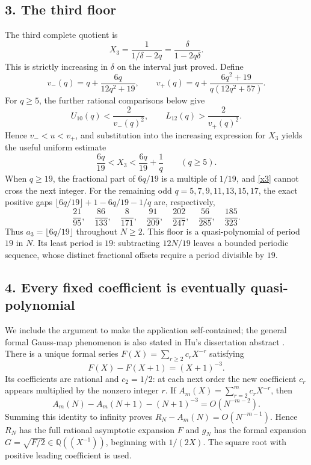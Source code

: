 \documentclass[11pt]{article}
\newcommand{\Q}{\mathbb Q}
\begin{document}
\subsection*{3. The third floor}
The third complete quotient is
\[
 X_3=\frac1{1/\delta-2q}=\frac{\delta}{1-2q\delta}.
\]
This is strictly increasing in $\delta$ on the interval just proved.
Define
\[
 v_-(q)=q+\frac{6q}{12q^2+19},\qquad
 v_+(q)=q+\frac{6q^2+19}{q(12q^2+57)}.
\]
For $q\ge5$, the further rational comparisons below give
\[
 U_{10}(q)<\frac2{v_-(q)^2},
 \qquad L_{12}(q)>\frac2{v_+(q)^2}.
\]
Hence $v_-<u<v_+$, and substitution into the increasing expression
for $X_3$ yields the useful uniform estimate
\begin{equation}\label{x3}
 \frac{6q}{19}<X_3<\frac{6q}{19}+\frac1q\qquad(q\ge5).
\end{equation}
When $q\ge19$, the fractional part of $6q/19$ is a multiple of $1/19$,
and \eqref{x3} cannot cross the next integer. For the remaining odd
$q=5,7,9,11,13,15,17$, the exact positive gaps
$\lfloor6q/19\rfloor+1-6q/19-1/q$ are, respectively,
\[
 \frac{21}{95},\quad\frac{86}{133},\quad\frac8{171},\quad
 \frac{91}{209},\quad\frac{202}{247},\quad
 \frac{56}{285},\quad\frac{185}{323}.
\]
Thus $a_3=\lfloor6q/19\rfloor$ throughout $N\ge2$.
This floor is a quasi-polynomial of period $19$ in $N$.
Its least period is $19$: subtracting $12N/19$ leaves a bounded
periodic sequence, whose distinct fractional offsets require a period
divisible by $19$.

\subsection*{4. Every fixed coefficient is eventually quasi-polynomial}
We include the argument to make the application self-contained; the
general formal Gauss-map phenomenon is also stated in Hu's dissertation
abstract \cite{H}.
There is a unique formal series
$F(X)=\sum_{r\ge2}c_rX^{-r}$ satisfying
\begin{equation}\label{diff}
 F(X)-F(X+1)=(X+1)^{-3}.
\end{equation}
Its coefficients are rational and $c_2=1/2$: at each next order the
new coefficient $c_r$ appears multiplied by the nonzero integer $r$.
If $A_m(X)=\sum_{r=2}^m c_rX^{-r}$, then
\[
 A_m(N)-A_m(N+1)-(N+1)^{-3}=O(N^{-m-2}).
\]
Summing this identity to infinity proves
$R_N-A_m(N)=O(N^{-m-1})$. Hence $R_N$ has the full rational
asymptotic expansion $F$ and $g_N$ has the formal expansion
$G=\sqrt{F/2}\in\Q((X^{-1}))$, beginning with $1/(2X)$.
The square root with positive leading coefficient is used.
\end{document}
